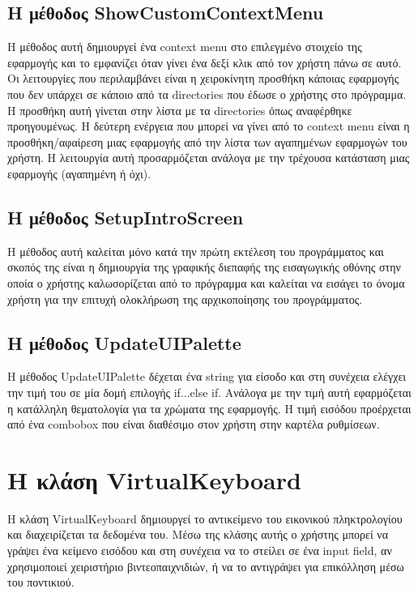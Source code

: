 \subsection{Η μέθοδος ShowCustomContextMenu}
Η μέθοδος αυτή δημιουργεί ένα context menu στο επιλεγμένο στοιχείο της εφαρμογής και
το εμφανίζει όταν γίνει ένα δεξί κλικ από τον χρήστη πάνω σε αυτό. Οι λειτουργίες που
περιλαμβάνει είναι η χειροκίνητη προσθήκη κάποιας εφαρμογής που δεν υπάρχει σε κάποιο
από τα directories που έδωσε ο χρήστης στο πρόγραμμα. Η προσθήκη αυτή γίνεται στην
λίστα με τα directories όπως αναφέρθηκε προηγουμένως. Η δεύτερη ενέργεια που μπορεί
να γίνει από το context menu είναι η προσθήκη/αφαίρεση μιας εφαρμογής από την λίστα των
αγαπημένων εφαρμογών του χρήστη. Η λειτουργία αυτή προσαρμόζεται ανάλογα με την τρέχουσα
κατάσταση μιας εφαρμογής (αγαπημένη ή όχι).

\subsection{Η μέθοδος SetupIntroScreen}
Η μέθοδος αυτή καλείται μόνο κατά την πρώτη εκτέλεση του προγράμματος και σκοπός της
είναι η δημιουργία της γραφικής διεπαφής της εισαγωγικής οθόνης στην οποία ο χρήστης
καλωσορίζεται από το πρόγραμμα και καλείται να εισάγει το όνομα χρήστη για την επιτυχή
ολοκλήρωση της αρχικοποίησης του προγράμματος. 


\subsection{Η μέθοδος UpdateUIPalette}
Η μέθοδος UpdateUIPalette δέχεται ένα string για είσοδο και στη συνέχεια
ελέγχει την τιμή του σε μία δομή επιλογής if...else if. Ανάλογα με την τιμή αυτή εφαρμόζεται
η κατάλληλη θεματολογία για τα χρώματα της εφαρμογής. Η τιμή εισόδου προέρχεται από
ένα combobox που είναι διαθέσιμο στον χρήστη στην καρτέλα ρυθμίσεων.






\section{Η κλάση VirtualKeyboard}

Η κλάση VirtualKeyboard δημιουργεί το αντικείμενο του εικονικού πληκτρολογίου και διαχειρίζεται
τα δεδομένα του. Μέσω της κλάσης αυτής ο χρήστης μπορεί να γράψει ένα κείμενο εισόδου και στη
συνέχεια να το στείλει σε ένα input field, αν χρησιμοποιεί χειριστήριο βιντεοπαιχνιδιών, ή να 
το αντιγράψει για επικόλληση μέσω του ποντικιού.  


